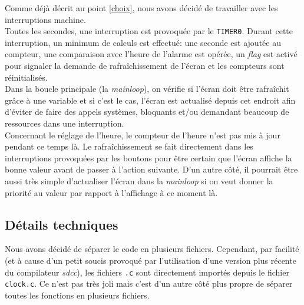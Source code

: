 Comme déjà décrit au point \ref{choix}, nous avons décidé de travailler avec les interruptions machine.\\

Toutes les secondes, une interruption est provoquée par le \texttt{TIMER0}. Durant cette interruption, un minimum de calculs est effectué: une seconde est ajoutée au compteur, une comparaison avec l'heure de l'alarme est opérée, un \textit{flag} est activé pour signaler la demande de rafraîchissement de l'écran et les compteurs sont réinitialisés.\\
Dans la boucle principale (la \textit{mainloop}), on vérifie si l'écran doit être rafraîchit grâce à une variable et si c'est le cas, l'écran est actualisé depuis cet endroit afin d'éviter de faire des appels systèmes, bloquants et/ou demandant beaucoup de ressources dans une interruption.\\

Concernant le réglage de l'heure, le compteur de l'heure n'est pas mis à jour pendant ce temps là. Le rafraîchissement se fait directement dans les interruptions provoquées par les boutons pour être certain que l'écran affiche la bonne valeur avant de passer à l'action suivante. D'un autre côté, il pourrait être aussi très simple d'actualiser l'écran dans la \textit{mainloop} si on veut donner la priorité au valeur par rapport à l'affichage à ce moment là.

\subsection{Détails techniques}

Nous avons décidé de séparer le code en plusieurs fichiers. Cependant, par facilité (et à cause d'un petit soucis provoqué par l'utilisation d'une version plus récente du compilateur \textit{sdcc}), les fichiers \texttt{.c} sont directement importés depuis le fichier \texttt{clock.c}. Ce n'est pas très joli mais c'est d'un autre côté plus propre de séparer toutes les fonctions en plusieurs fichiers.
